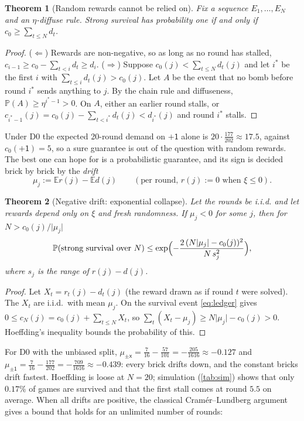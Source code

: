 \documentclass[11pt,a4paper]{article}
\newtheorem{theorem}{Theorem}[section]
\theoremstyle{definition}
\theoremstyle{remark}
\newcommand{\E}{\mathbb{E}}
\renewcommand{\P}{\mathbb{P}}
\newcommand{\pU}{\ensuremath{\mathord{+}\mathsf{1}}}
\newcommand{\abs}[1]{\lvert #1\rvert}
\begin{document}
\begin{theorem}[Random rewards cannot be relied on]\label{thm:diffuse}
Fix a sequence $E_1,\dots,E_N$ and an $\eta$-diffuse rule. Strong survival has
probability one if and only if $c_0\ge\sum_{t\le N}d_t$.
\end{theorem}
\begin{proof}
($\Leftarrow$) Rewards are non-negative, so as long as no round has stalled,
$c_{i-1}\ge c_0-\sum_{t<i}d_t\ge d_i$.
($\Rightarrow$) Suppose $c_0(j)<\sum_{t\le N}d_t(j)$ and let $i^*$ be the first $i$
with $\sum_{t\le i}d_t(j)>c_0(j)$. Let $A$ be the event that no bomb before round $i^*$
sends anything to $j$. By the chain rule and diffuseness, $\P(A)\ge\eta^{i^*-1}>0$. On
$A$, either an earlier round stalls, or
$c_{i^*-1}(j)=c_0(j)-\sum_{t<i^*}d_t(j)<d_{i^*}(j)$ and round $i^*$ stalls.
\end{proof}

Under D0 the expected 20-round demand on $\pU$ alone is $20\cdot\frac{177}{202}\approx17.5$,
against $c_0(\pU)=5$, so a sure guarantee is out of the question with random rewards.
The best one can hope for is a probabilistic guarantee, and its sign is decided brick by
brick by the \emph{drift}
\[
\mu_j:=\E r(j)-\E d(j)\qquad(\text{per round, }r(j):=0\text{ when }\xi\le0).
\]

\begin{theorem}[Negative drift: exponential collapse]\label{thm:negdrift}
Let the rounds be i.i.d. and let rewards depend only on $\xi$ and fresh randomness. If
$\mu_j<0$ for some $j$, then for $N>c_0(j)/\abs{\mu_j}$
\[
\P(\text{strong survival over }N)\le
\exp\Bigl(-\frac{2\,(N\abs{\mu_j}-c_0(j))^2}{N\,s_j^2}\Bigr),
\]
where $s_j$ is the range of $r(j)-d(j)$.
\end{theorem}
\begin{proof}
Let $X_t=r_t(j)-d_t(j)$ (the reward drawn as if round $t$ were solved). The $X_t$ are
i.i.d.\ with mean $\mu_j$. On the survival event \eqref{eq:ledger} gives
$0\le c_N(j)=c_0(j)+\sum_{t\le N}X_t$, so
$\sum_t(X_t-\mu_j)\ge N\abs{\mu_j}-c_0(j)>0$. Hoeffding's inequality bounds the
probability of this.
\end{proof}

For D0 with the unbiased split, $\mu_{\pm\mathsf x}=\frac7{16}-\frac{57}{101}=-\frac{205}{1616}\approx-0.127$
and $\mu_{\pm\mathsf 1}=\frac7{16}-\frac{177}{202}=-\frac{709}{1616}\approx-0.439$: every brick
drifts down, and the constant bricks drift fastest. Hoeffding is loose at $N=20$;
simulation (\cref{tab:sim}) shows that only $0.17\%$ of games are survived and that the
first stall comes at round $5.5$ on average. When all drifts are positive, the classical
Cramér--Lundberg argument gives a bound that holds for an unlimited number of rounds:
\end{document}

